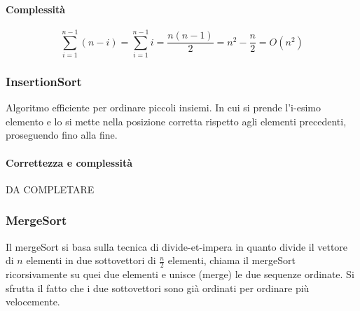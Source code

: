\paragraph{Complessit\`a}
\begin{equation*}
\sum\limits_{i=1}^{n-1}(n-i)=\sum\limits_{i=1}^{n-1}i=\dfrac{n(n-1)}{2}=n^2-\dfrac{n}{2}=O(n^2)
\end{equation*}
\subsubsection{InsertionSort}
Algoritmo efficiente per ordinare piccoli insiemi. In cui si prende l'i-esimo elemento e lo si mette nella posizione corretta rispetto agli elementi
precedenti, proseguendo fino alla fine.
\begin{algorithm}
\DontPrintSemicolon
{}

\caption{\protect{}}

\end{algorithm}
\paragraph{Correttezza e complessit\`a}
DA COMPLETARE
\subsubsection{MergeSort}
Il mergeSort si basa sulla tecnica di divide-et-impera in quanto divide il vettore di $n$ elementi in due sottovettori di $\frac{n}{2}$ elementi, chiama il
mergeSort ricorsivamente su quei due elementi e unisce (merge) le due sequenze ordinate. Si sfrutta il fatto che i due sottovettori sono gi\`a ordinati per
ordinare pi\`u velocemente.
